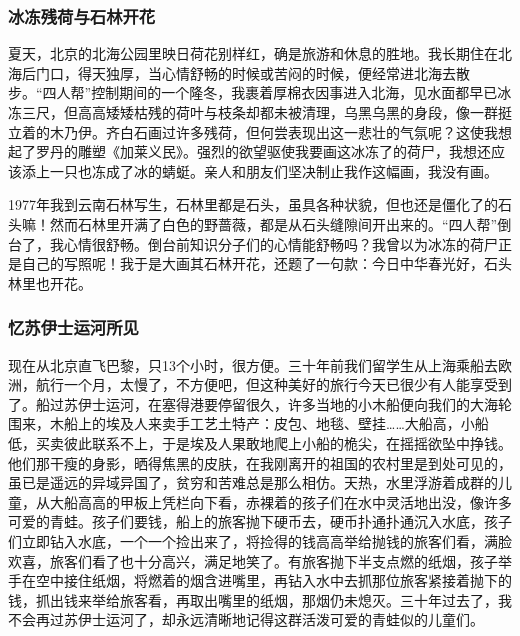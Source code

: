 \documentclass{article}
\begin{document}
\subsubsection{冰冻残荷与石林开花}
夏天，北京的北海公园里映日荷花别样红，确是旅游和休息的胜地。我长期住在北海后门口，得天独厚，当心情舒畅的时候或苦闷的时候，便经常进北海去散步。“四人帮”控制期间的一个隆冬，我裹着厚棉衣因事进入北海，见水面都早已冰冻三尺，但高高矮矮枯残的荷叶与枝条却都未被清理，乌黑乌黑的身段，像一群挺立着的木乃伊。齐白石画过许多残荷，但何尝表现出这一悲壮的气氛呢？这使我想起了罗丹的雕塑《加莱义民》。强烈的欲望驱使我要画这冰冻了的荷尸，我想还应该添上一只也冻成了冰的蜻蜓。亲人和朋友们坚决制止我作这幅画，我没有画。

1977年我到云南石林写生，石林里都是石头，虽具各种状貌，但也还是僵化了的石头嘛！然而石林里开满了白色的野蔷薇，都是从石头缝隙间开出来的。“四人帮”倒台了，我心情很舒畅。倒台前知识分子们的心情能舒畅吗？我曾以为冰冻的荷尸正是自己的写照呢！我于是大画其石林开花，还题了一句款：今日中华春光好，石头林里也开花。
\subsubsection{忆苏伊士运河所见}
现在从北京直飞巴黎，只13个小时，很方便。三十年前我们留学生从上海乘船去欧洲，航行一个月，太慢了，不方便吧，但这种美好的旅行今天已很少有人能享受到了。船过苏伊士运河，在塞得港要停留很久，许多当地的小木船便向我们的大海轮围来，木船上的埃及人来卖手工艺土特产：皮包、地毯、壁挂……大船高，小船低，买卖彼此联系不上，于是埃及人果敢地爬上小船的桅尖，在摇摇欲坠中挣钱。他们那干瘦的身影，晒得焦黑的皮肤，在我刚离开的祖国的农村里是到处可见的，虽已是遥远的异域异国了，贫穷和苦难总是那么相仿。天热，水里浮游着成群的儿童，从大船高高的甲板上凭栏向下看，赤裸着的孩子们在水中灵活地出没，像许多可爱的青蛙。孩子们要钱，船上的旅客抛下硬币去，硬币扑通扑通沉入水底，孩子们立即钻入水底，一个一个捡出来了，将捡得的钱高高举给抛钱的旅客们看，满脸欢喜，旅客们看了也十分高兴，满足地笑了。有旅客抛下半支点燃的纸烟，孩子举手在空中接住纸烟，将燃着的烟含进嘴里，再钻入水中去抓那位旅客紧接着抛下的钱，抓出钱来举给旅客看，再取出嘴里的纸烟，那烟仍未熄灭。三十年过去了，我不会再过苏伊士运河了，却永远清晰地记得这群活泼可爱的青蛙似的儿童们。
\end{document}
